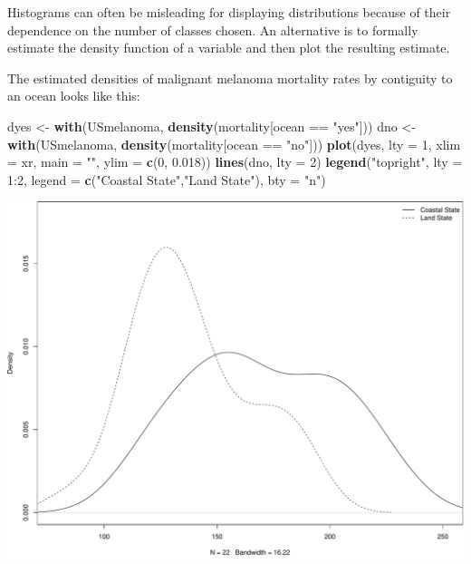 \documentclass[]{article}
\newenvironment{Shaded}{\begin{snugshade}}{\end{snugshade}}
\newcommand{\KeywordTok}[1]{\textcolor[rgb]{0.13,0.29,0.53}{\textbf{{#1}}}}
\newcommand{\DataTypeTok}[1]{\textcolor[rgb]{0.13,0.29,0.53}{{#1}}}
\newcommand{\DecValTok}[1]{\textcolor[rgb]{0.00,0.00,0.81}{{#1}}}
\newcommand{\FloatTok}[1]{\textcolor[rgb]{0.00,0.00,0.81}{{#1}}}
\newcommand{\StringTok}[1]{\textcolor[rgb]{0.31,0.60,0.02}{{#1}}}
\newcommand{\NormalTok}[1]{{#1}}
\numberwithin{equation}{section}
\begin{document}
Histograms can often be misleading for displaying distributions because
of their dependence on the number of classes chosen. An alternative is
to formally estimate the density function of a variable and then plot
the resulting estimate.

The estimated densities of malignant melanoma mortality rates by
contiguity to an ocean looks like this:

\begin{Shaded}
\begin{Highlighting}[]
\NormalTok{dyes <-}\StringTok{ }\KeywordTok{with}\NormalTok{(USmelanoma, }\KeywordTok{density}\NormalTok{(mortality[ocean ==}\StringTok{ "yes"}\NormalTok{]))}
\NormalTok{dno <-}\StringTok{ }\KeywordTok{with}\NormalTok{(USmelanoma, }\KeywordTok{density}\NormalTok{(mortality[ocean ==}\StringTok{ "no"}\NormalTok{]))}
\KeywordTok{plot}\NormalTok{(dyes, }\DataTypeTok{lty =} \DecValTok{1}\NormalTok{, }\DataTypeTok{xlim =} \NormalTok{xr, }\DataTypeTok{main =} \StringTok{""}\NormalTok{, }\DataTypeTok{ylim =} \KeywordTok{c}\NormalTok{(}\DecValTok{0}\NormalTok{, }\FloatTok{0.018}\NormalTok{))}
\KeywordTok{lines}\NormalTok{(dno, }\DataTypeTok{lty =} \DecValTok{2}\NormalTok{)}
\KeywordTok{legend}\NormalTok{(}\StringTok{"topright"}\NormalTok{, }\DataTypeTok{lty =} \DecValTok{1}\NormalTok{:}\DecValTok{2}\NormalTok{, }\DataTypeTok{legend =} \KeywordTok{c}\NormalTok{(}\StringTok{"Coastal State"}\NormalTok{,}\StringTok{"Land State"}\NormalTok{), }\DataTypeTok{bty =} \StringTok{"n"}\NormalTok{)}
\end{Highlighting}
\end{Shaded}

\begin{center}\includegraphics{tema1_files/figure-latex/unnamed-chunk-160-1} \end{center}
\end{document}
